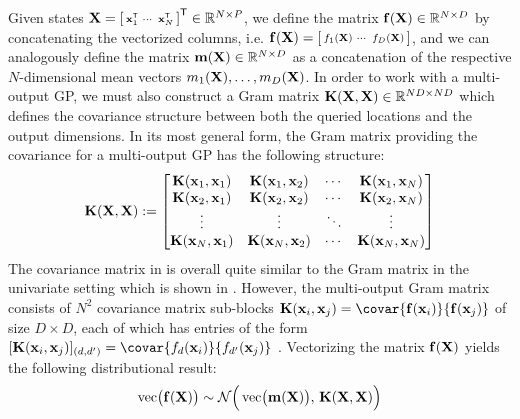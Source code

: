 \documentclass[10pt]{article}
\DeclareMathOperator{\vect}{vec}
\begin{document}
Given states $\mathbf{X} = \begin{bsmallmatrix} \mathbf{x}_{1}^{\scriptscriptstyle{\mathsf{T}}} & \cdots & \mathbf{x}_{N}^{\scriptscriptstyle{\mathsf{T}}} \end{bsmallmatrix}^{\scriptstyle{\mathsf{T}}} \in \mathbb{R}^{N \times P}$, we define the matrix $\mathbf{f}(\mathbf{X}) \in \mathbb{R}^{N \times D}$ by concatenating the vectorized columns, i.e. $\mathbf{f}(\mathbf{X}) = \begin{bsmallmatrix}f_{1}(\mathbf{X}) & \cdots & f_{D}(\mathbf{X})\end{bsmallmatrix}$, and we can analogously define the matrix $\mathbf{m}(\mathbf{X}) \in \mathbb{R}^{N \times D}$ as a concatenation of the respective $N$-dimensional mean vectors $m_{1}(\mathbf{X}), \dots, m_{D}(\mathbf{X})$. In order to work with a multi-output GP, we must also construct a Gram matrix $\mathbf{K}(\mathbf{X}, \mathbf{X}) \in \mathbb{R}^{ND \times ND}$ which defines the covariance structure between both the queried locations and the output dimensions. In its most general form, the Gram matrix providing the covariance for a multi-output GP has the following structure:
\begin{equation}
\label{eq:MOGP-gram-matrix}
    \mathbf{K}(\mathbf{X}, \mathbf{X}) := \begin{bmatrix}
        \mathbf{K}(\mathbf{x}_{1}, \mathbf{x}_{1}) & \mathbf{K}(\mathbf{x}_{1}, \mathbf{x}_{2}) & \cdots & \mathbf{K}(\mathbf{x}_{1}, \mathbf{x}_{N})\\
        \mathbf{K}(\mathbf{x}_{2}, \mathbf{x}_{1}) & \mathbf{K}(\mathbf{x}_{2}, \mathbf{x}_{2}) & \cdots & \mathbf{K}(\mathbf{x}_{2}, \mathbf{x}_{N})\\
        \vdots & \vdots & \ddots & \vdots\\
        \mathbf{K}(\mathbf{x}_{N}, \mathbf{x}_{1}) & \mathbf{K}(\mathbf{x}_{N}, \mathbf{x}_{2}) & \cdots & \mathbf{K}(\mathbf{x}_{N}, \mathbf{x}_{N})
    \end{bmatrix}
\end{equation}
The covariance matrix in  is overall quite similar to the Gram matrix in the univariate setting which is shown in . However, the multi-output Gram matrix consists of $N^{2}$ covariance matrix sub-blocks $\bfK(\bfx_{i}, \bfx_{j}) = \covar{\bff(\bfx_{i})}{\bff(\bfx_{j})}$ of size $D \times D$, each of which has entries of the form $[\bfK(\bfx_{i}, \bfx_{j})]_{(d,d')} = \covar{f_{d}(\bfx_{i})}{f_{d'}(\bfx_{j})}$ \citep{Alvarez-Vector-Kernels-2012}. Vectorizing the matrix $\mathbf{f}(\mathbf{X})$ yields the following distributional result:
\begin{equation}
\label{eq:MOGP-fun-distribution}
    \vect\!\big(\bff(\bfX)\big) \sim \calN\Big(\vect\!\big(\bfm(\bfX)\big),\, \bfK(\bfX, \bfX)\Big)
\end{equation}
\end{document}

